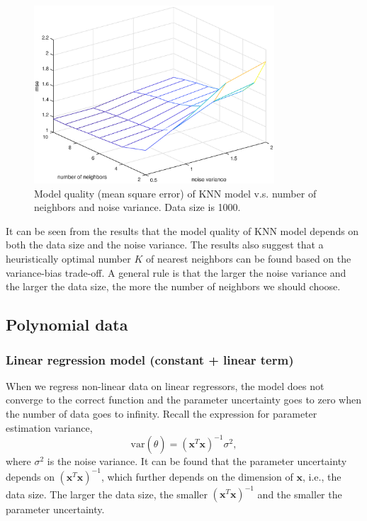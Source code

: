 \documentclass[]{article}
\begin{document}
\begin{figure}[H]
	\caption{Model quality (mean square error) of KNN model v.s. number of neighbors and noise variance. Data size is 1000.}
	\label{fig:KNNnoisevariance}
	\centering
	\includegraphics[width=0.8\textwidth]{project3d2}
\end{figure}

It can be seen from the results that the model quality of KNN model depends on both the data size and the noise variance. The results also suggest that a heuristically optimal number $K$ of nearest neighbors can be found based on the variance-bias trade-off. A general rule is that the larger the noise variance and the larger the data size, the more the number of neighbors we should choose.

\subsection{Polynomial  data}

\subsubsection{Linear regression model (constant + linear term)}

When we regress non-linear data on linear regressors, the model does not converge to the correct function and the parameter uncertainty goes to zero when the number of data goes to infinity. Recall the expression for parameter estimation variance,
\begin{equation}
\text{var}(\hat{\theta}) = (\mathbf{x}^T\mathbf{x})^{-1}\sigma^2,
\end{equation}
where $\sigma^2$ is the noise variance. It can be found that the parameter uncertainty depends on $(\mathbf{x}^T\mathbf{x})^{-1}$, which further depends on the dimension of $\mathbf{x}$, i.e., the data size. The larger the data size, the smaller $(\mathbf{x}^T\mathbf{x})^{-1}$ and the smaller the parameter uncertainty. 
\end{document}

